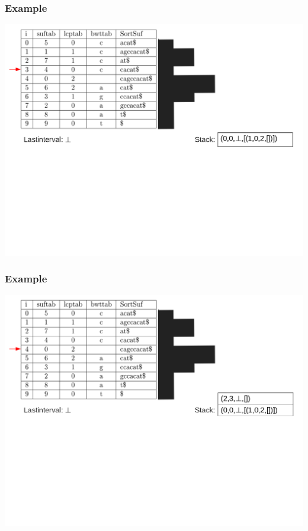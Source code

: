 \documentclass[compress,handout]{beamer} %
\begin{document}
\begin{frame}
	\frametitle{Example}
	\includegraphics[width=\textwidth, height=\textheight, keepaspectratio=true]{traversal_6}
\end{frame}

\begin{frame}
	\frametitle{Example}
	\includegraphics[width=\textwidth, height=\textheight, keepaspectratio=true]{traversal_7}
\end{frame}
\end{document}
